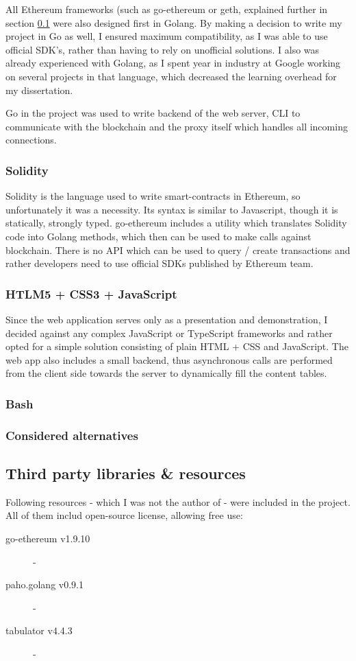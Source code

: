 All Ethereum frameworks (such as go-ethereum or geth, explained further in section \ref{sec:tpp} were also designed first in Golang. By making a decision to write my project in Go as well, I ensured maximum compatibility, as I was able to use official SDK's, rather than having to rely on unofficial solutions. I also was already experienced with Golang, as I spent year in industry at Google working on several projects in that language, which decreased the learning overhead for my dissertation.

Go in the project was used to write backend of the web server, CLI to communicate with the blockchain and the proxy itself which handles all incoming connections.
\subsubsection{Solidity}
Solidity \cite{dannen2017introducing} is the language used to write smart-contracts in Ethereum, so unfortunately it was a necessity. Its syntax is similar to Javascript, though it is statically, strongly typed. go-ethereum includes a utility which translates Solidity code into Golang methods, which then can be used to make calls against blockchain. There is no API which can be used to query / create transactions and rather developers need to use official SDKs published by Ethereum team.
\subsubsection{HTLM5 + CSS3 + JavaScript}
Since the web application serves only as a presentation and demonstration, I decided against any complex JavaScript or TypeScript frameworks and rather opted for a simple solution consisting of plain HTML + CSS and JavaScript. The web app also includes a small backend, thus asynchronous calls are performed from the client side towards the server to dynamically fill the content tables.
\subsubsection{Bash}

\subsubsection{Considered alternatives}

\subsection{Third party libraries \& resources}\label{sec:tpp}
Following resources - which I was not the author of - were included in the project. All of them includ open-source license, allowing free use:
\begin{description}
    \item[go-ethereum v1.9.10] \cite{ethereum2017official} - 
    \item[paho.golang v0.9.1] \cite{pahogolang} -
    \item[tabulator v4.4.3] \cite{tabulator} -
\end{description}


